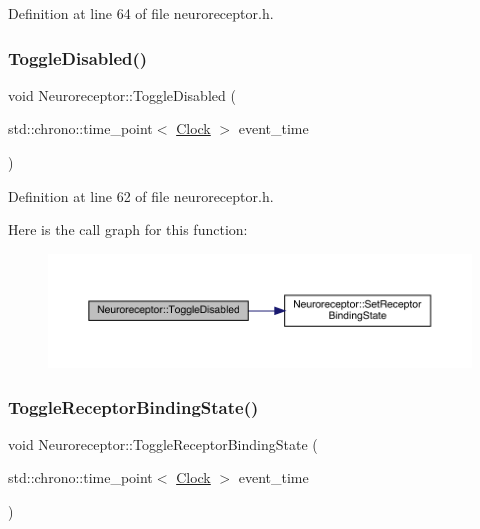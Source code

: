 Definition at line 64 of file neuroreceptor.\+h.

\mbox{\label{class_neuroreceptor_a8a339a4d0f150bbdfbc2650155625196}} 
\subsubsection{\texorpdfstring{Toggle\+Disabled()}{ToggleDisabled()}}
{\footnotesize\ttfamily void Neuroreceptor\+::\+Toggle\+Disabled (\begin{DoxyParamCaption}\item[{std\+::chrono\+::time\+\_\+point$<$ \hyperlink{universe_8h_a0ef8d951d1ca5ab3cfaf7ab4c7a6fd80}{Clock} $>$}]{event\+\_\+time }\end{DoxyParamCaption})\hspace{0.3cm}{\ttfamily [inline]}}



Definition at line 62 of file neuroreceptor.\+h.

Here is the call graph for this function\+:
\nopagebreak
\begin{figure}[H]
\begin{center}
\leavevmode
\includegraphics[width=350pt]{class_neuroreceptor_a8a339a4d0f150bbdfbc2650155625196_cgraph}
\end{center}
\end{figure}
\mbox{\label{class_neuroreceptor_ace41227d30a8f50e1a6efadc86573f80}} 
\subsubsection{\texorpdfstring{Toggle\+Receptor\+Binding\+State()}{ToggleReceptorBindingState()}}
{\footnotesize\ttfamily void Neuroreceptor\+::\+Toggle\+Receptor\+Binding\+State (\begin{DoxyParamCaption}\item[{std\+::chrono\+::time\+\_\+point$<$ \hyperlink{universe_8h_a0ef8d951d1ca5ab3cfaf7ab4c7a6fd80}{Clock} $>$}]{event\+\_\+time }\end{DoxyParamCaption})\hspace{0.3cm}{\ttfamily [inline]}}



